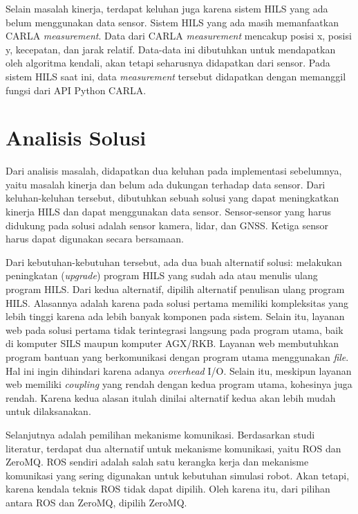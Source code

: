 Selain masalah kinerja, terdapat keluhan juga karena sistem HILS yang ada belum
menggunakan data sensor. Sistem HILS yang ada masih memanfaatkan CARLA
\textit{measurement}. Data dari CARLA \textit{measurement} mencakup posisi x,
posisi y, kecepatan, dan jarak relatif. Data-data ini dibutuhkan untuk
mendapatkan oleh algoritma kendali, akan tetapi seharusnya didapatkan dari
sensor. Pada sistem HILS saat ini, data \textit{measurement} tersebut didapatkan
dengan memanggil fungsi dari API Python CARLA.

\section{Analisis Solusi}

Dari analisis masalah, didapatkan dua keluhan pada implementasi sebelumnya,
yaitu masalah kinerja dan belum ada dukungan terhadap data sensor. Dari
keluhan-keluhan tersebut, dibutuhkan sebuah solusi yang dapat meningkatkan
kinerja HILS dan dapat menggunakan data sensor. Sensor-sensor yang harus
didukung pada solusi adalah sensor kamera, lidar, dan GNSS. Ketiga sensor harus
dapat digunakan secara bersamaan.

Dari kebutuhan-kebutuhan tersebut, ada dua buah alternatif solusi: melakukan
peningkatan (\textit{upgrade}) program HILS yang sudah ada atau menulis ulang
program HILS. Dari kedua alternatif, dipilih alternatif penulisan ulang program
HILS. Alasannya adalah karena pada solusi pertama memiliki kompleksitas yang
lebih tinggi karena ada lebih banyak komponen pada sistem. Selain itu, layanan
web pada solusi pertama tidak terintegrasi langsung pada program utama, baik di
komputer SILS maupun komputer AGX/RKB. Layanan web membutuhkan program bantuan
yang berkomunikasi dengan program utama menggunakan \textit{file}. Hal ini ingin
dihindari karena adanya \textit{overhead} I/O. Selain itu, meskipun layanan web
memiliki \textit{coupling} yang rendah dengan kedua program utama, kohesinya
juga rendah. Karena kedua alasan itulah dinilai alternatif kedua akan lebih
mudah untuk dilaksanakan.

Selanjutnya adalah pemilihan mekanisme komunikasi. Berdasarkan studi literatur,
terdapat dua alternatif untuk mekanisme komunikasi, yaitu ROS dan ZeroMQ. ROS
sendiri adalah salah satu kerangka kerja dan mekanisme komunikasi yang sering
digunakan untuk kebutuhan simulasi robot. Akan tetapi, karena kendala teknis ROS
tidak dapat dipilih. Oleh karena itu, dari pilihan antara ROS dan ZeroMQ,
dipilih ZeroMQ.

